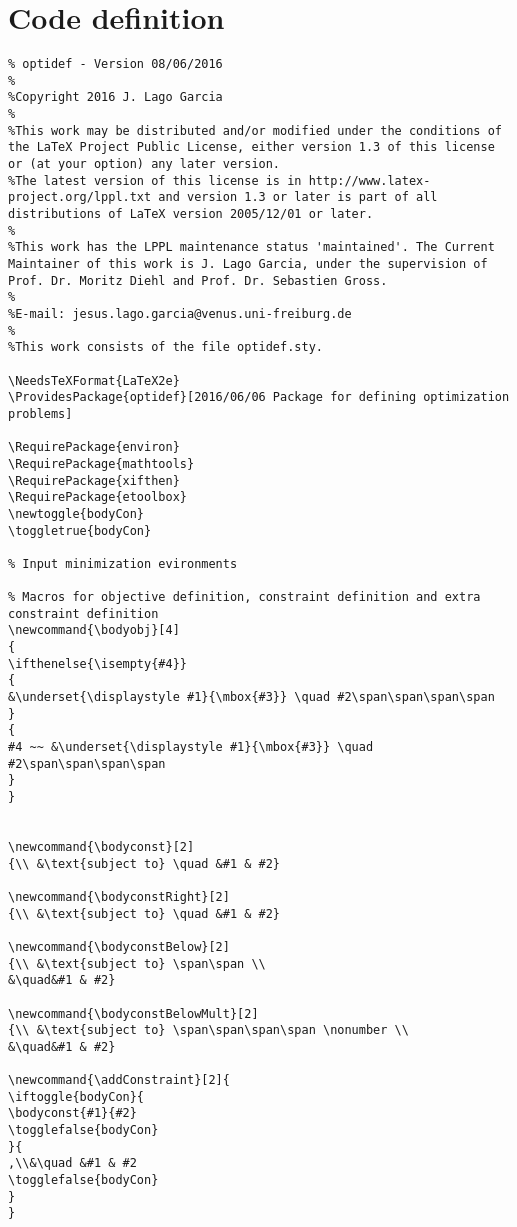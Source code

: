 \documentclass[]{report}
\begin{document}
\section{Code definition}
\begin{verbatim}
% optidef - Version 08/06/2016
%
%Copyright 2016 J. Lago Garcia
%
%This work may be distributed and/or modified under the conditions of the LaTeX Project Public License, either version 1.3 of this license or (at your option) any later version.
%The latest version of this license is in http://www.latex-project.org/lppl.txt and version 1.3 or later is part of all distributions of LaTeX version 2005/12/01 or later.
%
%This work has the LPPL maintenance status 'maintained'. The Current Maintainer of this work is J. Lago Garcia, under the supervision of Prof. Dr. Moritz Diehl and Prof. Dr. Sebastien Gross.
%
%E-mail: jesus.lago.garcia@venus.uni-freiburg.de
%
%This work consists of the file optidef.sty.

\NeedsTeXFormat{LaTeX2e}
\ProvidesPackage{optidef}[2016/06/06 Package for defining optimization problems]

\RequirePackage{environ}
\RequirePackage{mathtools}	
\RequirePackage{xifthen}	
\RequirePackage{etoolbox}	
\newtoggle{bodyCon}
\toggletrue{bodyCon}

% Input minimization evironments

% Macros for objective definition, constraint definition and extra constraint definition
\newcommand{\bodyobj}[4]
{
\ifthenelse{\isempty{#4}}
{
&\underset{\displaystyle #1}{\mbox{#3}} \quad #2\span\span\span\span
}
{
#4 ~~ &\underset{\displaystyle #1}{\mbox{#3}} \quad #2\span\span\span\span
}
}


\newcommand{\bodyconst}[2]
{\\ &\text{subject to} \quad &#1 & #2}

\newcommand{\bodyconstRight}[2]
{\\ &\text{subject to} \quad &#1 & #2}

\newcommand{\bodyconstBelow}[2]
{\\ &\text{subject to} \span\span \\
&\quad&#1 & #2}

\newcommand{\bodyconstBelowMult}[2]
{\\ &\text{subject to} \span\span\span\span \nonumber \\
&\quad&#1 & #2}

\newcommand{\addConstraint}[2]{
\iftoggle{bodyCon}{
\bodyconst{#1}{#2}
\togglefalse{bodyCon}
}{
,\\&\quad &#1 & #2
\togglefalse{bodyCon}
}
}


\end{verbatim}
\end{document}
